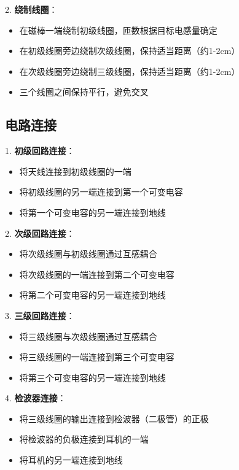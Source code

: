 \documentclass[12pt,UTF8]{ctexbook}
\begin{document}
2. \textbf{绕制线圈}：
   \begin{itemize}[leftmargin=3.5em]
   \item 在磁棒一端绕制初级线圈，匝数根据目标电感量确定
   \item 在初级线圈旁边绕制次级线圈，保持适当距离（约1-2cm）
   \item 在次级线圈旁边绕制三级线圈，保持适当距离（约1-2cm）
   \item 三个线圈之间保持平行，避免交叉
   \end{itemize}

\subsection{电路连接}

1. \textbf{初级回路连接}：
   \begin{itemize}[leftmargin=3.5em]
   \item 将天线连接到初级线圈的一端
   \item 将初级线圈的另一端连接到第一个可变电容
   \item 将第一个可变电容的另一端连接到地线
   \end{itemize}

2. \textbf{次级回路连接}：
   \begin{itemize}[leftmargin=3.5em]
   \item 将次级线圈与初级线圈通过互感耦合
   \item 将次级线圈的一端连接到第二个可变电容
   \item 将第二个可变电容的另一端连接到地线
   \end{itemize}

3. \textbf{三级回路连接}：
   \begin{itemize}[leftmargin=3.5em]
   \item 将三级线圈与次级线圈通过互感耦合
   \item 将三级线圈的一端连接到第三个可变电容
   \item 将第三个可变电容的另一端连接到地线
   \end{itemize}

4. \textbf{检波器连接}：
   \begin{itemize}[leftmargin=3.5em]
   \item 将三级线圈的输出连接到检波器（二极管）的正极
   \item 将检波器的负极连接到耳机的一端
   \item 将耳机的另一端连接到地线
   \end{itemize}
\end{document}
